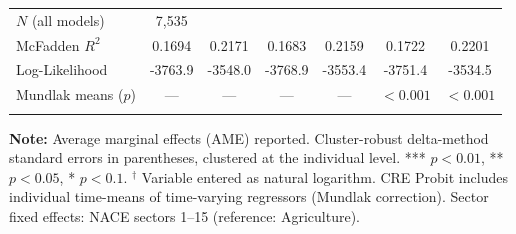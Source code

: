 \begin{landscape}
\begin{table}[htbp]
\begin{tabular*}{\linewidth}{ @{\extracolsep{\fill}} @{}lcccccc@{} @{} }
  \midrule
  $N$ (all models) & 7,535 &  &  &  &  &  \\
  McFadden $R^2$ & 0.1694 & 0.2171 & 0.1683 & 0.2159 & 0.1722 & 0.2201 \\
  Log-Likelihood & -3763.9 & -3548.0 & -3768.9 & -3553.4 & -3751.4 & -3534.5 \\
  Mundlak means ($p$) & --- & --- & --- & --- & $< 0.001$ & $< 0.001$ \\
  \bottomrule
  \vspace{1.5pt}
\end{tabular*}
\smallskip
\begin{minipage}{\linewidth}
\footnotesize
\textbf{Note:} Average marginal effects (AME) reported. Cluster-robust delta-method standard errors in parentheses, clustered at the individual level. *** $p<0.01$, ** $p<0.05$, * $p<0.1$. $^\dagger$ Variable entered as natural logarithm. CRE Probit includes individual time-means of time-varying regressors (Mundlak correction). Sector fixed effects: NACE sectors 1--15 (reference: Agriculture).
\end{minipage}
\end{table}
\end{landscape}
